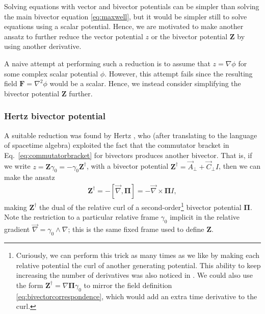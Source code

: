 \documentclass[1p,sort&compress]{elsarticle}
\numberwithin{equation}{section}
\newcommand{\rv}[1]{\vec{#1}}
\newcommand{\bv}[1]{\mathbf{#1}}
\begin{document}
Solving equations with vector and bivector potentials can be simpler than solving the main bivector equation \eqref{eq:maxwell}, but it would be simpler still to solve equations using a scalar potential.  Hence, we are motivated to make another ansatz to further reduce the vector potential $z$ or the bivector potential $\bv{Z}$ by using another derivative.  

A naive attempt at performing such a reduction is to assume that $z = \nabla \phi$ for some complex scalar potential $\phi$. However, this attempt fails since the resulting field $\bv{F} = \nabla^2\phi$ would be a scalar.  Hence, we instead consider simplifying the bivector potential $\bv{Z}$ further.


\subsubsection{Hertz bivector potential}


A suitable reduction was found by Hertz \cite{Hertz1889}, who (after translating to the language of spacetime algebra) exploited the fact that the commutator bracket in Eq.~\eqref{eq:commutatorbracket} for bivectors produces another bivector.  That is, if we write $z = \bv{Z}\gamma_0 = -\gamma_0\bv{Z}^\dagger$, with a bivector potential $\bv{Z}^\dagger = \rv{A}_\perp + \rv{C}_\perp I$, then we can make the ansatz
\begin{align}\label{eq:hertzpotential}
  \bv{Z}^\dagger = -[\rv{\nabla},\bv{\Pi}] = -\rv{\nabla}\times\bv{\Pi} I,
\end{align}
making $\bv{Z}^\dagger$ the dual of the relative curl of a second-order\footnote{Curiously, we can perform this trick as many times as we like by making each relative potential the curl of another generating potential.  This ability to keep increasing the number of derivatives was also noticed in \cite{Cameron2012b,VanEnk2013}.  We could also use the form $\bv{Z}^\dagger = \nabla\bv{\Pi}\gamma_0$ to mirror the field definition \eqref{eq:bivectorcorrespondence}, which would add an extra time derivative to the curl.} bivector potential $\bv{\Pi}$.  Note the restriction to a particular relative frame $\gamma_0$ implicit in the relative gradient $\rv{\nabla} = \gamma_0 \wedge \nabla$; this is the same fixed frame used to define $\bv{Z}$. 
\end{document}
